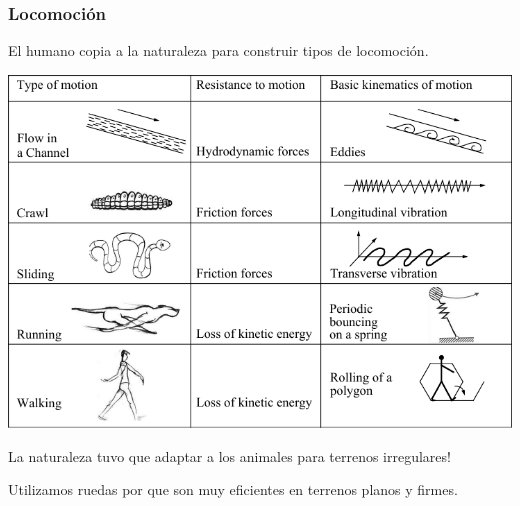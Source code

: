 
\begin{frame}
    \frametitle{Locomoción}
    \small
    El humano copia a la naturaleza para construir tipos de locomoción.

    \begin{center}
        \includegraphics[width=0.7\columnwidth]{images/biological_locomotion_systems.pdf}
    \end{center}

    La naturaleza tuvo que adaptar a los animales para terrenos irregulares!


    Utilizamos ruedas por que son muy eficientes en terrenos planos y firmes.
\end{frame}


